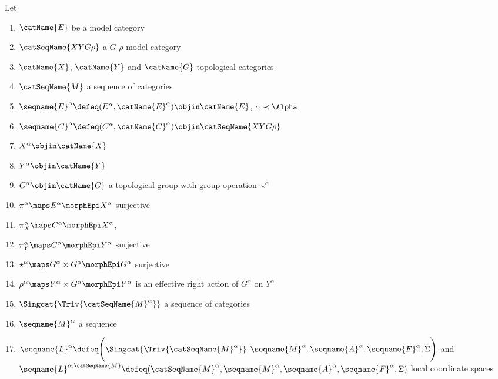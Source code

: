 \documentclass{article}
\begin{document}
\begin{theorem}
\label{the:LCStoBun}
Let
\begin{enumerate}
\item
$\catName{E}$ be a model category

\item
$\catSeqName{XYG\rho}$ a $G$-$\rho$-model category

\item
$\catName{X}$, $\catName{Y}$ and $\catName{G}$ topological categories

\item
$\catSeqName{M}$ a sequence of categories

\item
$
  \seqname{E}^\alpha \defeq (E^\alpha,\catName{E}^\alpha)
  \objin
  \catName{E}
$,
$\alpha \prec \Alpha$

\item
$
  \seqname{C}^\alpha \defeq (C^\alpha,\catName{C}^\alpha)
  \objin
  \catSeqName{XYG\rho}
$

\item
$X^\alpha \objin \catName{X}$

\item
$Y^\alpha \objin \catName{Y}$

\item
$G^\alpha \objin \catName{G}$ a topological group with group operation
$\star^\alpha$

\item
$\pi^\alpha \maps E^\alpha \morphEpi X^\alpha$ surjective

\item
$\pi^\alpha_X \maps C^\alpha \morphEpi X^\alpha$,

\item
$\pi^\alpha_Y \maps C^\alpha \morphEpi Y^\alpha$ surjective

\item
$\star^\alpha \maps G^\alpha \times G^\alpha \morphEpi G^\alpha$ surjective

\item
$\rho^\alpha \maps Y^\alpha \times G^\alpha \morphEpi Y^\alpha$ is
an effective right action of $G^\alpha$ on $Y^\alpha$

\item
$\Singcat{\Triv{\catSeqName{M}^\alpha}}$ a sequence of categories

\item
$\seqname{M}^\alpha$ a sequence

\item
$
  \seqname{L}^\alpha \defeq
  \Biggl (
    \Singcat{\Triv{\catSeqName{M}^\alpha}},
    \seqname{M}^\alpha,
    \seqname{A}^\alpha,
    \seqname{F}^\alpha,
    \Sigma
  \Biggr )
$
and
$
  \seqname{L}^{\alpha,\catSeqName{M}} \defeq
  (
    \catSeqName{M}^\alpha,
    \seqname{M}^\alpha,
    \seqname{A}^\alpha,
    \seqname{F}^\alpha,
    \Sigma
  )
$
local coordinate spaces


\end{enumerate}
\end{theorem}
\end{document}
